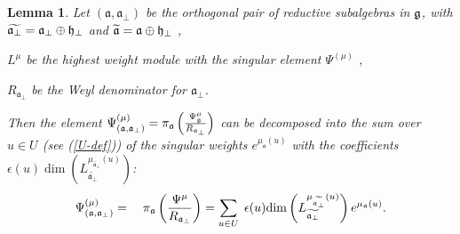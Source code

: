 \documentclass[12pt]{iopart}
\newtheorem{lemma}{Lemma}
\theoremstyle{definition}
\newcommand{\af}{\mathfrak{a}}
\newcommand{\afb}{\mathfrak{a}_{\bot}}
\begin{document}
\begin{lemma}
\label{lemma}
Let $\left( \af,\afb \right)$ be the orthogonal pair of reductive
subalgebras in $\frak{g}$, with $\widetilde{\af_{\perp }}=\af%
_{\perp }\oplus \frak{h}_{\perp }$ and $\widetilde{\af}=\af\oplus
\frak{h}_{\perp }$ ,

$L^{\mu }$ be the highest weight module with the singular element
$\Psi ^{\left(\mu \right)}$ ,

$R_{\af_{\perp }}$ be the Weyl denominator for $\af_{\perp }$.

Then the element $\Psi ^{\left( \mu \right) }_{\left(  \af, \afb \right)}
=\pi _{\af}\left( \frac{\Psi _{\frak{g}}^{\mu }}{R_{\af_{\perp }}}\right) $
can be decomposed into the sum over $u\in U$ (see (\ref{U-def})) of
the singular weights $e^{\mu _{\af}\left( u\right) }$ with the
coefficients $\epsilon (u)\mathrm{\dim }\left( L_{\widetilde{\af_{\perp
}}}^{\mu _{\widetilde{\af_{\perp }}}\left( u\right) }\right) $:
\begin{equation}
\Psi ^{\left( \mu \right) }_{\left(  \af, \afb \right)}=\quad \pi _{\af}\left( \frac{\Psi^{\mu }}{R_{\af%
_{\perp }}}\right) =\sum_{u\in U}\;\epsilon (u)\mathrm{\dim }
\left( L_{\widetilde{\af_{\perp }}}^{\mu _{%
\widetilde{\af_{\perp }}}\left( u\right) }\right) e^{\mu _{\af}\left( u \right) }.
\end{equation}
\end{lemma}
\end{document}
